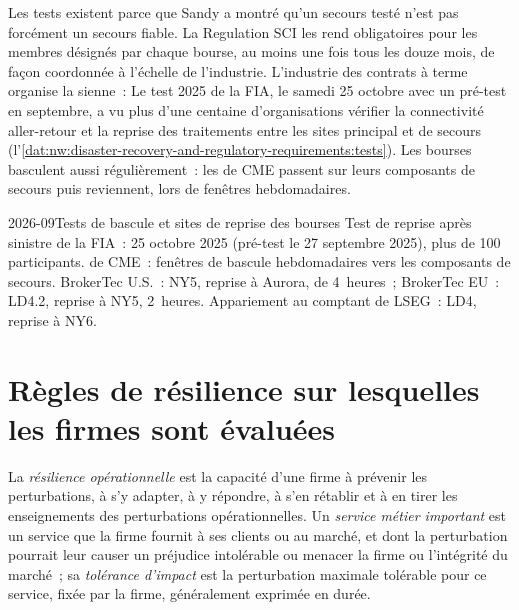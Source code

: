 Les tests existent parce que Sandy a montré qu'un secours testé n'est pas forcément un secours fiable. La Regulation SCI les rend obligatoires pour les membres
désignés par chaque bourse, au moins une fois tous les douze mois, de façon coordonnée à l'échelle de l'industrie. L'industrie des contrats à terme organise la sienne~:
Le test 2025 de la FIA, le samedi 25 octobre avec un pré-test en septembre, a vu plus d'une centaine d'organisations vérifier
la connectivité aller-retour et la reprise des traitements entre les sites principal et de secours (l'\cref{dat:nw:disaster-recovery-and-regulatory-requirements:tests}).
Les bourses basculent aussi régulièrement~: les  de CME passent sur leurs composants de secours puis reviennent, lors de fenêtres hebdomadaires.

\begin{dated}{2026-09}{Tests de bascule et sites de reprise des bourses}\label{dat:nw:disaster-recovery-and-regulatory-requirements:tests}
Test de reprise après sinistre de la FIA~: 25 octobre 2025 (pré-test le 27 septembre 2025), plus de 100 participants.  de CME~:
fenêtres de bascule hebdomadaires vers les composants de secours. BrokerTec U.S.~: NY5, reprise à Aurora,  de 4~heures~; BrokerTec
EU~: LD4.2, reprise à NY5, 2~heures. Appariement au comptant de LSEG~: LD4, reprise à NY6.
\end{dated}

\section{Règles de résilience sur lesquelles les firmes sont évaluées}

\begin{definition}\label{def:nw:disaster-recovery-and-regulatory-requirements:resilience}
La \emph{résilience opérationnelle} est la capacité d'une firme à prévenir les perturbations, à s'y adapter, à y répondre, à s'en rétablir et
à en tirer les enseignements des perturbations opérationnelles. Un \emph{service métier important} est un service que la firme
fournit à ses clients ou au marché, et dont la perturbation pourrait leur causer un préjudice intolérable ou menacer la firme ou l'intégrité du marché~; sa
\emph{tolérance d'impact} est la perturbation maximale tolérable pour ce service, fixée par la firme, généralement exprimée en durée.
\end{definition}

